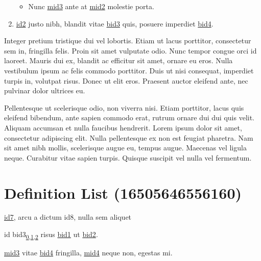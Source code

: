 \begin{enumerate}
\begin{itemize}
\item {} 
\sphinxAtStartPar
Nunc \hyperlink{\detokenize{test-mid3-id1}}{\hypertarget{\detokenize{test-mid3-id0}}{mid3}} ante at \hyperlink{\detokenize{test-mid2-id0}}{\hypertarget{\detokenize{test-mid2-id1}}{mid2}} molestie porta.

\end{itemize}

\item {} 
\sphinxAtStartPar
\hyperlink{\detokenize{id2}}{id2} justo nibh, blandit vitae \hyperlink{\detokenize{bid3}}{\hypertarget{\detokenize{bid3-ref17}}{bid3}} quis, posuere
imperdiet \hyperlink{\detokenize{bid4}}{\hypertarget{\detokenize{bid4-ref18}}{bid4}}.

\end{enumerate}

\sphinxAtStartPar
Integer pretium tristique dui vel lobortis. Etiam ut lacus porttitor, consectetur sem in, fringilla
felis. Proin sit amet vulputate odio. Nunc tempor congue orci id laoreet. Mauris dui ex, blandit ac
efficitur sit amet, ornare eu eros. Nulla vestibulum ipsum ac felis commodo porttitor. Duis ut nisi
consequat, imperdiet turpis in, volutpat risus. Donec ut elit eros. Praesent auctor eleifend ante,
nec pulvinar dolor ultrices eu.

\sphinxAtStartPar
Pellentesque ut scelerisque odio, non viverra nisi. Etiam porttitor, lacus quis eleifend bibendum,
ante sapien commodo erat, rutrum ornare dui dui quis velit. Aliquam accumsan et nulla faucibus
hendrerit. Lorem ipsum dolor sit amet, consectetur adipiscing elit. Nulla pellentesque ex non est
feugiat pharetra. Nam sit amet nibh mollis, scelerisque augue eu, tempus augue. Maecenas vel ligula
neque. Curabitur vitae sapien turpis. Quisque suscipit vel nulla vel fermentum.


\section{Definition List (16505646556160)}
\label{\detokenize{test:definition-list-16505646556160}}\begin{description}
\sphinxAtStartPar
\hyperlink{\detokenize{id7}}{id7}, arcu a dictum \hypertarget{\detokenize{id8}}{id8}, nulla sem aliquet

\sphinxAtStartPar
id \hypertarget{\detokenize{bid3}}{bid3}\texorpdfstring{\textsubscript{\hyperlink{\detokenize{bid3-ref7}}{0},\hyperlink{\detokenize{bid3-ref17}}{1},\hyperlink{\detokenize{bid3-ref30}}{2}}}{} risus \hyperlink{\detokenize{bid1}}{\hypertarget{\detokenize{bid1-ref20}}{bid1}} ut \hyperlink{\detokenize{bid2}}{\hypertarget{\detokenize{bid2-ref21}}{bid2}}.

\sphinxAtStartPar
\hyperlink{\detokenize{test-mid3-id0}}{\hypertarget{\detokenize{test-mid3-id1}}{mid3}} vitae \hyperlink{\detokenize{bid4}}{\hypertarget{\detokenize{bid4-ref22}}{bid4}} fringilla, \hyperlink{\detokenize{test-mid4-id0}}{\hypertarget{\detokenize{test-mid4-id1}}{mid4}} neque non, egestas mi.

\end{description}


